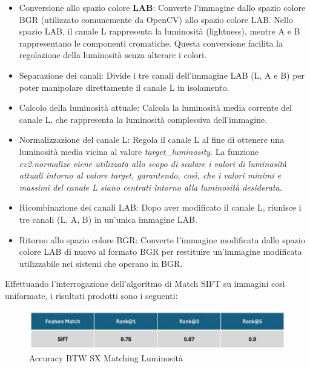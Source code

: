 \documentclass[12pt,a4paper,openright,twoside]{book}
\begin{document}
\begin{itemize}
\item Conversione allo spazio colore \textbf{LAB}: Converte l'immagine dallo spazio colore BGR (utilizzato comunemente da OpenCV) allo spazio colore LAB. Nello spazio LAB, il canale L rappresenta la luminosità (lightness), mentre A e B rappresentano le componenti cromatiche. Questa conversione facilita la regolazione della luminosità senza alterare i colori.
\item Separazione dei canali: Divide i tre canali dell'immagine LAB (L, A e B) per poter manipolare direttamente il canale L in isolamento.
\item Calcolo della luminosità attuale: Calcola la luminosità media corrente del canale L, che rappresenta la luminosità complessiva dell'immagine.
\item Normalizzazione del canale L: Regola il canale L al fine di ottenere una luminosità media vicina al valore {\itshape target\_luminosity}. La funzione \itshape{cv2.normalize} viene utilizzata allo scopo di scalare i valori di luminosità attuali intorno al valore target, garantendo, così, che i valori minimi e massimi del canale L siano centrati intorno alla luminosità desiderata.
\item Ricombinazione dei canali LAB: Dopo aver modificato il canale L, riunisce i tre canali (L, A, B) in un'unica immagine LAB.
\item Ritorno allo spazio colore BGR: Converte l'immagine modificata dallo spazio colore LAB di nuovo al formato BGR per restituire un’immagine modificata utilizzabile nei sistemi che operano in BGR.
\end{itemize}
Effettuando l'interrogazione dell'algoritmo di Match SIFT su immagini così uniformate, i risultati prodotti sono i seguenti:
\begin{figure}[H]
	\centering
	\includegraphics{figures/sx10.pdf}
    	\caption{Accuracy BTW SX Matching Luminosità}
	\label{fig:sx10}
\end{figure}
\end{document}

